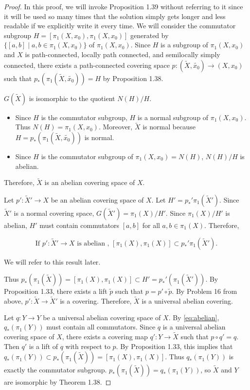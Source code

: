 \documentclass[12pt, psamsfonts]{amsart}
\theoremstyle{definition}
\theoremstyle{remark}
\numberwithin{equation}{section}
\begin{document}
\begin{proof}
  In this proof, we will invoke Proposition 1.39 without referring to it since it will be used so many times that the solution simply gets longer and less readable if we explicitly write it every time.
  We will consider the commutator subgroup $H = [\pi_1(X, x_0), \pi_1(X, x_0)]$ generated by $\{ [a, b] \mid a, b \in \pi_1(X, x_0) \}$ of $\pi_1(X, x_0)$.
  Since $H$ is a subgroup of $\pi_1(X, x_0)$ and $X$ is path-connected, locally path connected, and semilocally simply connected, there exists a path-connected covering space $p: (\tilde{X}, \tilde{x_0}) \rightarrow (X, x_0)$ such that $p_*(\pi_1(\tilde{X}, \tilde{x_0})) = H$ by Proposition 1.38.

  $G(\tilde{X})$ is isomorphic to the quotient $N(H) / H$.
  \begin{itemize}
    \item
      Since $H$ is the commutator subgroup, $H$ is a normal subgroup of $\pi_1(X, x_0)$.
      Thus $N(H) = \pi_1(X, x_0)$.
      Moreover, $\tilde{X}$ is normal because $H = p_*(\pi_1(\tilde{X}, \tilde{x_0}))$ is normal.
    \item
      Since $H$ is the commutator subgroup of $\pi_1(X, x_0) = N(H)$, $N(H) / H$ is abelian.
  \end{itemize}
  Therefore, $\tilde{X}$ is an abelian covering space of $X$.

  Let $p': \tilde{X}' \rightarrow X$ be an abelian covering space of $X$.
  Let $H' = p_*'\pi_1(\tilde{X}')$.
  Since $\tilde{X}'$ is a normal covering space, $G(\tilde{X}') = \pi_1(X) / H'$.
  Since $\pi_1(X) / H'$ is abelian, $H'$ must contain commutators $[a, b]$ for all $a, b \in \pi_1(X)$.
  Therefore,

  \begin{equation}
    \text{If $p': \tilde{X}' \rightarrow X$ is abelian , $[\pi_1(X), \pi_1(X)] \subset p_*'\pi_1(\tilde{X}')$.} \label{eq:abelian}
  \end{equation}

  We will refer to this result later.

  Thus $p_*(\pi_1(\tilde{X})) = [\pi_1(X), \pi_1(X)] \subset H' = p_*'(\pi_1(\tilde{X}'))$.
  By Proposition 1.33, there exists a lift $\tilde{p}$ such that $p = p' \circ \tilde{p}$.
  By Problem 16 from above, $p': \tilde{X} \rightarrow \tilde{X}'$ is a covering.
  Therefore, $\tilde{X}$ is a universal abelian covering.

  Let $q: Y \rightarrow Y$ be a universal abelian covering space of $X$.
  By \eqref{eq:abelian}, $q_*(\pi_1(Y))$ must contain all commutators.
  Since $q$ is a universal abelian covering space of $X$, there exists a covering map $q': Y \rightarrow \tilde{X}$ such that $p \circ q' = q$.
  Then $q'$ is a lift of $q$ with respect to $p$.
  By Proposition 1.33, this implies that $q_*(\pi_1(Y)) \subset p_*(\pi_1(\tilde{X})) = [\pi_1(X), \pi_1(X)]$.
  Thus $q_*(\pi_1(Y))$ is exactly the commutator subgroup.
  $p_*(\pi_1(\tilde{X})) = q_*(\pi_1(Y))$, so $\tilde{X}$ and $Y$ are isomorphic by Theorem 1.38.


\end{proof}
\end{document}
